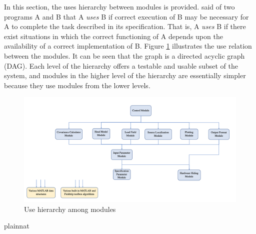 \documentclass[12pt, titlepage]{article}
\begin{document}
In this section, the uses hierarchy between modules is
provided. \citet{Parnas1978} said of two programs A and B that A {\em uses} B if
correct execution of B may be necessary for A to complete the task described in
its specification. That is, A {\em uses} B if there exist situations in which
the correct functioning of A depends upon the availability of a correct
implementation of B.  Figure \ref{FigUH} illustrates the use relation between
the modules. It can be seen that the graph is a directed acyclic graph
(DAG). Each level of the hierarchy offers a testable and usable subset of the
system, and modules in the higher level of the hierarchy are essentially simpler
because they use modules from the lower levels.

\begin{figure}[H]
\centering
\includegraphics[width=1\textwidth]{UsesHierarchy.png}
\caption{Use hierarchy among modules}
\label{FigUH}
\end{figure}


 {plainnat}

\end{document}
